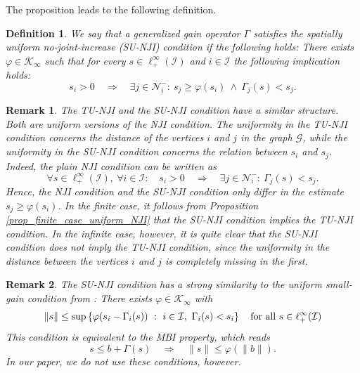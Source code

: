 \documentclass[10pt, oneside, a4paper]{article}
\newcommand{\GC}{\mathcal{G}}
\newcommand{\IC}{\mathcal{I}}
\newcommand{\KC}{\mathcal{K}}
\newcommand{\NC}{\mathcal{N}}
\newtheorem{definition}{Definition}[section]
\newtheorem{remark}{Remark}[section]
\begin{document}
The proposition leads to the following definition.%

\begin{definition}
We say that a generalized gain operator $\Gamma$ satisfies the \emph{spatially uniform no-joint-increase (SU-NJI) condition} if the following holds: There exists $\varphi \in \KC_{\infty}$ such that for every $s \in \ell^{\infty}_+(\IC)$ and $i \in \IC$ the following implication holds:%
\begin{equation*}
  s_i > 0 \quad \Rightarrow \quad \exists j \in \NC^-_i:\ s_j \geq \varphi(s_i) \ \wedge \ \Gamma_j(s) < s_j.%
\end{equation*}
\end{definition}

\begin{remark}
The TU-NJI and the SU-NJI condition have a similar structure. Both are uniform versions of the NJI condition. The uniformity in the TU-NJI condition concerns the distance of the vertices $i$ and $j$ in the graph $\GC$, while the uniformity in the SU-NJI condition concerns the relation between $s_i$ and $s_j$. Indeed, the plain NJI condition can be written as%
\begin{equation*}
  \forall s \in \ell^{\infty}_+(\IC),\ \forall i \in \IC:\quad s_i > 0 \quad \Rightarrow \quad \exists j \in \NC^-_i:\ \Gamma_j(s) < s_j.%
\end{equation*}
Hence, the NJI condition and the SU-NJI condition only differ in the estimate $s_j \geq \varphi(s_i)$. In the finite case, it follows from Proposition \ref{prop_finite_case_uniform_NJI} that the SU-NJI condition implies the TU-NJI condition. In the infinite case, however, it is quite clear that the SU-NJI condition does not imply the TU-NJI condition, since the uniformity in the distance between the vertices $i$ and $j$ is completely missing in the first.
\end{remark}

\begin{remark}\label{rem_uniform_sgc}
The SU-NJI condition has a strong similarity to the \emph{uniform small-gain condition} from \cite{KMG}: There exists $\varphi \in \KC_{\infty}$ with%
\begin{equation*}
  \|s\| \leq \sup\left\{ \varphi(s_i - \Gamma_i(s))\ :\ i \in \IC,\ \Gamma_i(s) < s_i \right\} \mbox{\quad for all\ } s \in \ell^{\infty}_+(\IC)%
\end{equation*}
This condition is equivalent to the MBI property, which reads%
\begin{equation*}
  s \leq b + \Gamma(s) \quad \Rightarrow \quad \|s\| \leq \varphi(\|b\|).%
\end{equation*}
In our paper, we do not use these conditions, however.
\end{remark}
\end{document}
